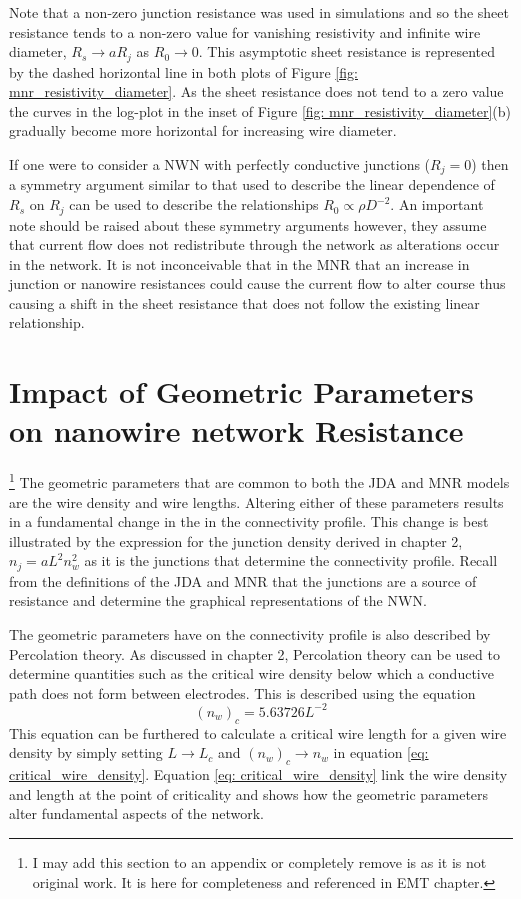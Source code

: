 Note that a non-zero junction resistance was used in simulations and so the sheet resistance tends to a non-zero value for vanishing resistivity and infinite wire diameter, $R_s \rightarrow a R_j$ as $R_0 \rightarrow 0$. This asymptotic sheet resistance is represented by the dashed horizontal line in both plots of Figure \ref{fig: mnr_resistivity_diameter}. As the sheet resistance does not tend to a zero value the curves in the log-plot in the inset of Figure \ref{fig: mnr_resistivity_diameter}(b) gradually become more horizontal for increasing wire diameter.

If one were to consider a NWN with perfectly conductive junctions ($R_j = 0$) then a symmetry argument similar to that used to describe the linear dependence of $R_s$ on $R_j$ can be used to describe the relationships $R_0 \propto \rho D^{-2}$. An important note should be raised about these symmetry arguments however, they assume that current flow does not redistribute through the network as alterations occur in the network. It is not inconceivable that in the MNR that an increase in junction or nanowire resistances could cause the current flow to alter course thus causing a shift in the sheet resistance that does not follow the existing linear relationship.


\section{Impact of Geometric Parameters on nanowire network Resistance}
\label{Sec: Geometric Properties}
\footnote{I may add this section to an appendix or completely remove is as it is not original work. It is here for completeness and referenced in EMT chapter.}
The geometric parameters that are common to both the JDA and MNR models are the wire density and wire lengths. Altering either of these parameters results in a fundamental change in the in the connectivity profile. This change is best illustrated by the expression for the junction density derived in chapter 2, $n_j = a L^2 n_w^2$ as it is the junctions that determine the connectivity profile. Recall from the definitions of the JDA and MNR that the junctions are a source of resistance and determine the graphical representations of the NWN. 

The geometric parameters have on the connectivity profile is also described by Percolation theory. As discussed in chapter 2, Percolation theory can be used to determine quantities such as the critical wire density below which a conductive path does not form between electrodes. This is described using the equation 
\begin{equation}
(n_w)_c = 5.63726 L^{-2}
\label{eq: critical_wire_density}
\end{equation}
This equation can be furthered to calculate a critical wire length for a given wire density by simply setting $L \rightarrow L_c$ and $(n_w)_c \rightarrow n_w$ in equation \ref{eq: critical_wire_density}. Equation \ref{eq: critical_wire_density} link the wire density and length at the point of criticality and shows how the geometric parameters alter fundamental aspects of the network. 

